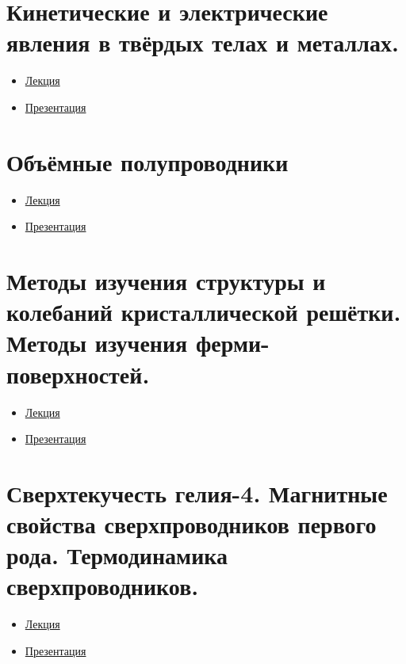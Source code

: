 \documentclass[a4paper]{article}
\begin{document}
\section{Кинетические и электрические явления в твёрдых телах и металлах.}
\begin{multicols}{2}
\begin{itemize}
\item 
\href{run:./lec-text/05-cynetics-2021-mar02.pdf}{Лекция}
\item 
\href{run:./lec-pres/05-slides-2021.pdf}{Презентация}
\end{itemize}
\end{multicols}
\section{Объёмные полупроводники}
\begin{multicols}{2}
\begin{itemize}
\item 
\href{run:./lec-text/06-semi-2021-mar06.pdf}{Лекция}
\item 
\href{run:./lec-pres/06-slides-2021fact.pdf}{Презентация}
\end{itemize}
\end{multicols}
\section{Методы изучения структуры
и колебаний кристаллической решётки. Методы изучения ферми-поверхностей.}
\begin{multicols}{2}
\begin{itemize}
\item 
\href{run:./lec-text/07-spectra-and-fermi-2021_mar13.pdf}{Лекция}
\item 
\href{run:./lec-pres/07-slides-2021.pdf}{Презентация}
\end{itemize}
\end{multicols}
\section{Сверхтекучесть гелия-4.
Магнитные свойства сверхпроводников первого рода. Термодинамика сверхпроводников.}
\begin{multicols}{2}
\begin{itemize}
\item 
\href{run:./lec-text/08-superfluid-2021_mar22.pdf}{Лекция}
\item 
\href{run:./lec-pres/08-slides-2021.pdf}{Презентация}
\end{itemize}
\end{multicols}
\end{document}
